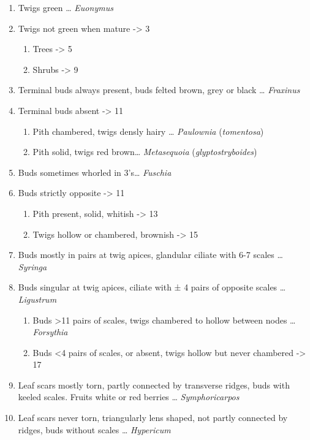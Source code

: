 \documentclass[openany]{book}
\providecommand{\tightlist}{%
  \setlength{\itemsep}{0pt}\setlength{\parskip}{0pt}}
\begin{document}
\begin{enumerate}
\def\labelenumi{\arabic{enumi}.}
\tightlist
\item
  Twigs green \ldots{} \emph{Euonymus}
\item
  Twigs not green when mature -\textgreater{} 3

  \begin{enumerate}
  \def\labelenumii{\arabic{enumii}.}
  \setcounter{enumii}{2}
  \tightlist
  \item
    Trees -\textgreater{} 5
  \item
    Shrubs -\textgreater{} 9
  \end{enumerate}
\item
  Terminal buds always present, buds felted brown, grey or black \ldots{} \emph{Fraxinus}
\item
  Terminal buds absent -\textgreater{} 11

  \begin{enumerate}
  \def\labelenumii{\arabic{enumii}.}
  \setcounter{enumii}{6}
  \tightlist
  \item
    Pith chambered, twigs densly hairy \ldots{} \emph{Paulownia} (\emph{tomentosa})
  \item
    Pith solid, twigs red brown\ldots{} \emph{Metasequoia} (\emph{glyptostryboides})
  \end{enumerate}
\item
  Buds sometimes whorled in 3's\ldots{} \emph{Fuschia}
\item
  Buds strictly opposite -\textgreater{} 11

  \begin{enumerate}
  \def\labelenumii{\arabic{enumii}.}
  \setcounter{enumii}{10}
  \tightlist
  \item
    Pith present, solid, whitish -\textgreater{} 13
  \item
    Twigs hollow or chambered, brownish -\textgreater{} 15
  \end{enumerate}
\item
  Buds mostly in pairs at twig apices, glandular ciliate with 6-7 scales \ldots{} \emph{Syringa}
\item
  Buds singular at twig apices, ciliate with ± 4 pairs of opposite scales \ldots{} \emph{Ligustrum}

  \begin{enumerate}
  \def\labelenumii{\arabic{enumii}.}
  \setcounter{enumii}{14}
  \tightlist
  \item
    Buds \textgreater{}11 pairs of scales, twigs chambered to hollow between nodes \ldots{} \emph{Forsythia}
  \item
    Buds \textless{}4 pairs of scales, or absent, twigs hollow but never chambered -\textgreater{} 17
  \end{enumerate}
\item
  Leaf scars mostly torn, partly connected by transverse ridges, buds with keeled scales. Fruits white or red berries \ldots{} \emph{Symphoricarpos}
\item
  Leaf scars never torn, triangularly lens shaped, not partly connected by ridges, buds without scales \ldots{} \emph{Hypericum}
\end{enumerate}
\end{document}
